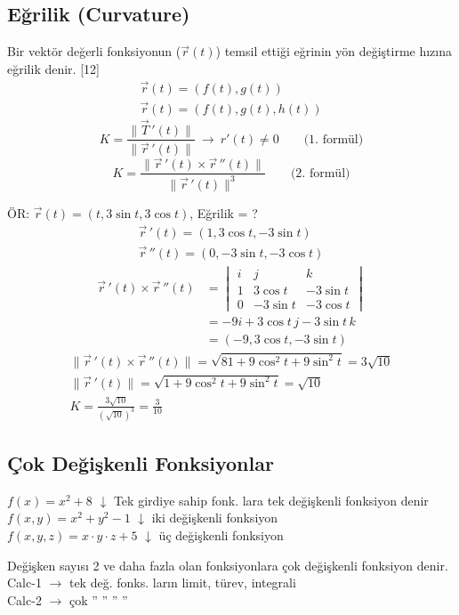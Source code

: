 \documentclass[11pt,a4paper]{article}
\begin{document}
\subsection{Eğrilik (Curvature)}
Bir vektör değerli fonksiyonun ($\vec r(t)$) temsil ettiği eğrinin yön değiştirme hızına eğrilik denir.
[12]
\begin{gather*}
\vec r(t)=(f(t),g(t))\\
\vec r(t)=(f(t),g(t),h(t))
\end{gather*}
\[ K=\frac{\|\vec T\,'(t)\|}{\|\vec r\,'(t)\|}\ \to\ r'(t)\neq0\qquad \text{(1. formül)} \]
\[ K=\frac{\|\vec r\,'(t)\times\vec r\,''(t)\|}{\|\vec r\,'(t)\|^3}\qquad \text{(2. formül)} \]

ÖR: $\vec r(t)=(t,3\sin t,3\cos t)$, Eğrilik = ?
\begin{gather*}
\vec r\,'(t)=(1,3\cos t,-3\sin t)\\
\vec r\,''(t)=(0,-3\sin t,-3\cos t)
\end{gather*}
\begin{align*}
\vec r\,'(t)\times\vec r\,''(t)&=\begin{vmatrix}i&j&k\\1&3\cos t&-3\sin t\\0&-3\sin t&-3\cos t\end{vmatrix}\\
&=-9i+3\cos t\,j-3\sin t\,k\\
&=(-9,3\cos t,-3\sin t)
\end{align*}
\begin{gather*}
\|\vec r\,'(t)\times\vec r\,''(t)\|=\sqrt{81+9\cos^2t+9\sin^2t}=3\sqrt{10}\\
\|\vec r\,'(t)\|=\sqrt{1+9\cos^2t+9\sin^2t}=\sqrt{10}\\
K=\frac{3\sqrt{10}}{(\sqrt{10})^3}=\frac{3}{10}
\end{gather*}

\subsection{Çok Değişkenli Fonksiyonlar}
$f(x)=x^2+8$ $\downarrow$ Tek girdiye sahip fonk. lara tek değişkenli fonksiyon denir\\
$f(x,y)=x^2+y^2-1$ $\downarrow$ iki değişkenli fonksiyon\\
$f(x,y,z)=x\cdot y\cdot z+5$ $\downarrow$ üç değişkenli fonksiyon

Değişken sayısı 2 ve daha fazla olan fonksiyonlara çok değişkenli fonksiyon denir.\\
Calc-1 $\to$ tek değ. fonks. ların limit, türev, integrali\\
Calc-2 $\to$ çok '' '' '' ''
\end{document}
